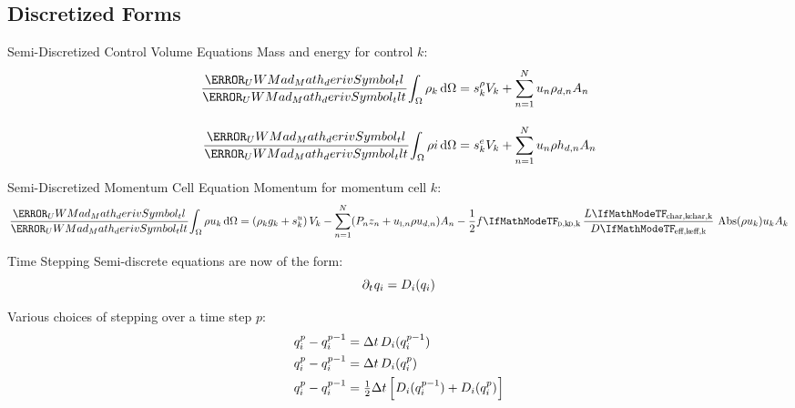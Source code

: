 \documentclass[10pt,t,xcolor=table,compress]{UWMadBeamer}
\begin{document}
    \subsection*{Discretized Forms}
    \begin{frame}{Semi-Discretized Control Volume Equations}
        Mass and energy for control $k$:
        \begin{align}
            \deriv{}{t}\!\IntV \rho_k \dV  &= s^\rho_k V_k + \sum_{n=1}^{N} u_n \rho_{d,n} A_n \\[1em]
            \deriv{}{t}\! \IntV \rho i \dV &= s^e_k V_k + \sum_{n=1}^{N} u_n \rho{h}_{d,n} A_n
        \end{align}
    \end{frame}
    
    
    \begin{frame}{Semi-Discretized Momentum Cell Equation}
        Momentum for momentum cell $k$:
        \begin{equation}
            \deriv{}{t}\! \IntV \rho u_k \dV = 
                (\rho_k g_k + s^u_k)\,V_k 
                - \sum_{n=1}^{N}   (P_n z_n +  u_{\text{\textsc{i}},n} \rho{u}_{d,n}) A_n 
                - \frac{1}{2} f\subs{\textsc{d},k}\,\frac{L\subs{char,k}}{D\subs{eff,k}}\,\Abs(\rho{u}_k) u_k A_k
        \end{equation}
    \end{frame}
    
    
    
    \begin{frame}{Time Stepping}
        Semi-discrete equations are now of the form:
        \begin{equation}
            \partial_t\:\! q_i = D_i(q_i)
        \end{equation}
        
        Various choices of stepping over a time step $p$:
        \begin{align}
            \qi^{p} - \qi^{p-1} &= \Delta{t}\,D_i(\qi^{p-1}) \\
            \qi^{p} - \qi^{p-1} &= \Delta{t}\,D_i(\qi^{p}) \\
            \qi^{p} - \qi^{p-1} &= \tfrac{1}{2}\Delta{t}\,\left[D_i(\qi^{p-1}) + D_i(\qi^{p})\right]
        \end{align}
    \end{frame}



\end{document}
